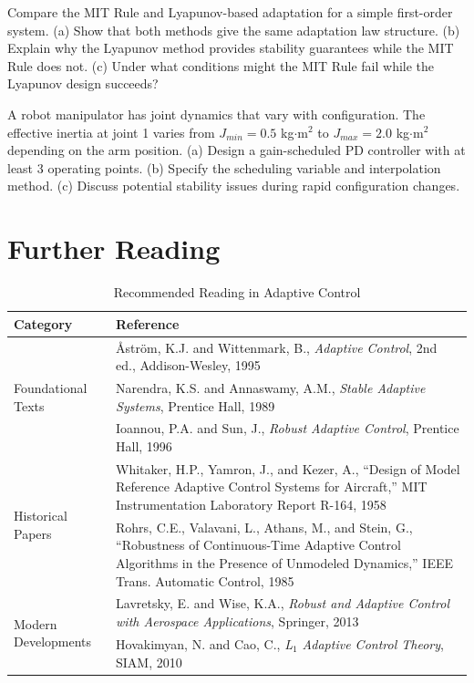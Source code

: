 \begin{exercise}
Compare the MIT Rule and Lyapunov-based adaptation for a simple first-order system. (a) Show that both methods give the same adaptation law structure. (b) Explain why the Lyapunov method provides stability guarantees while the MIT Rule does not. (c) Under what conditions might the MIT Rule fail while the Lyapunov design succeeds?
\end{exercise}

\begin{exercise}
A robot manipulator has joint dynamics that vary with configuration. The effective inertia at joint 1 varies from $J_{min} = 0.5$ kg$\cdot$m$^2$ to $J_{max} = 2.0$ kg$\cdot$m$^2$ depending on the arm position. (a) Design a gain-scheduled PD controller with at least 3 operating points. (b) Specify the scheduling variable and interpolation method. (c) Discuss potential stability issues during rapid configuration changes.
\end{exercise}

\section{Further Reading}
\label{sec:adaptive_reading}

\begin{table}[H]
\centering
\caption{Recommended Reading in Adaptive Control}
\begin{tabular}{p{3cm}p{9cm}}
\toprule
\textbf{Category} & \textbf{Reference} \\
\midrule
\multirow{3}{*}{Foundational Texts}
& \AA str\"om, K.J. and Wittenmark, B., \textit{Adaptive Control}, 2nd ed., Addison-Wesley, 1995 \\
& Narendra, K.S. and Annaswamy, A.M., \textit{Stable Adaptive Systems}, Prentice Hall, 1989 \\
& Ioannou, P.A. and Sun, J., \textit{Robust Adaptive Control}, Prentice Hall, 1996 \\
\midrule
\multirow{2}{*}{Historical Papers}
& Whitaker, H.P., Yamron, J., and Kezer, A., ``Design of Model Reference Adaptive Control Systems for Aircraft,'' MIT Instrumentation Laboratory Report R-164, 1958 \\
& Rohrs, C.E., Valavani, L., Athans, M., and Stein, G., ``Robustness of Continuous-Time Adaptive Control Algorithms in the Presence of Unmodeled Dynamics,'' IEEE Trans. Automatic Control, 1985 \\
\midrule
\multirow{2}{*}{Modern Developments}
& Lavretsky, E. and Wise, K.A., \textit{Robust and Adaptive Control with Aerospace Applications}, Springer, 2013 \\
& Hovakimyan, N. and Cao, C., \textit{L$_1$ Adaptive Control Theory}, SIAM, 2010 \\
\bottomrule
\end{tabular}
\end{table}

